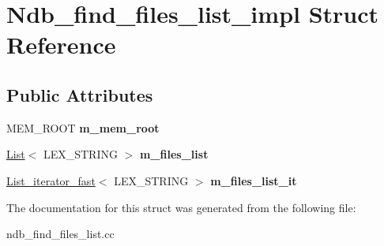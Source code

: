 \hypertarget{structNdb__find__files__list__impl}{}\section{Ndb\+\_\+find\+\_\+files\+\_\+list\+\_\+impl Struct Reference}
\label{structNdb__find__files__list__impl}
\subsection*{Public Attributes}
\begin{DoxyCompactItemize}
\item 
\mbox{\label{structNdb__find__files__list__impl_a2906f1edfc483391a6566de12b43e59e}} 
M\+E\+M\+\_\+\+R\+O\+OT {\bfseries m\+\_\+mem\+\_\+root}
\item 
\mbox{\label{structNdb__find__files__list__impl_a31015cc281fd74478a9e0fae1a799f3f}} 
\mbox{\hyperlink{classList}{List}}$<$ L\+E\+X\+\_\+\+S\+T\+R\+I\+NG $>$ {\bfseries m\+\_\+files\+\_\+list}
\item 
\mbox{\label{structNdb__find__files__list__impl_a61f21c85e54af42db1c936506dd49dc5}} 
\mbox{\hyperlink{classList__iterator__fast}{List\+\_\+iterator\+\_\+fast}}$<$ L\+E\+X\+\_\+\+S\+T\+R\+I\+NG $>$ {\bfseries m\+\_\+files\+\_\+list\+\_\+it}
\end{DoxyCompactItemize}


The documentation for this struct was generated from the following file\+:\begin{DoxyCompactItemize}
\item 
ndb\+\_\+find\+\_\+files\+\_\+list.\+cc\end{DoxyCompactItemize}
